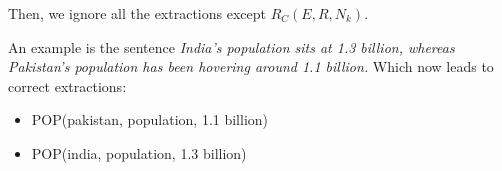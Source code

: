 \documentclass[a4paper,10pt]{article}
\begin{document}
Then, we ignore all the extractions except $R_C(E, R, N_k)$.

An example is the sentence
\emph{India's population sits at 1.3 billion, whereas Pakistan's population has been hovering around 1.1 billion.}
Which now leads to correct extractions:

\begin{itemize}
\item POP(pakistan, population, 1.1 billion)
\item POP(india, population, 1.3 billion)
\end{itemize}
\end{document}
